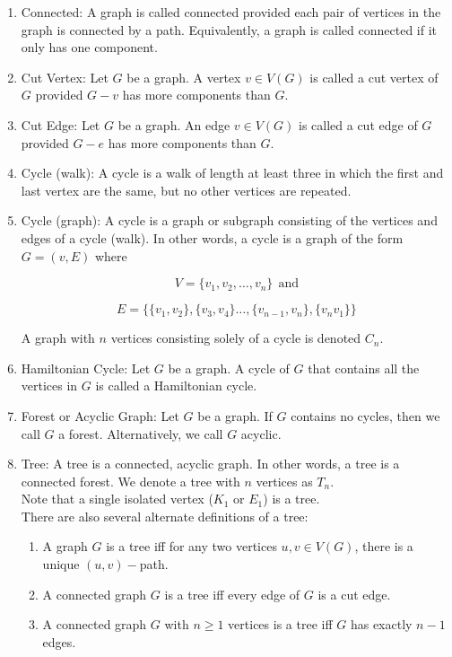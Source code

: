 \documentclass{article}
\begin{document}
\begin{enumerate}
    \item Connected: A graph is called connected provided each pair of vertices in the graph is connected by a path. Equivalently, a graph is called connected if it only has one component. 
    
    \item Cut Vertex: Let $G$ be a graph. A vertex $v\in V(G)$ is called a cut vertex of $G$ provided $G-v$ has more components than $G$.
    
    \item Cut Edge: Let $G$ be a graph. An edge $v\in V(G)$ is called a cut edge of $G$ provided $G-e$ has more components than $G$.
    
    \item Cycle (walk): A cycle is a walk of length at least three in which the first and last vertex are the same, but no other vertices are repeated.
    
    \item Cycle (graph): A cycle is a graph or subgraph consisting of the vertices and edges of a cycle (walk). In other words, a cycle is a graph of the form $G=(v,E)$ where 
    
    \[V=\{v_1,v_2,\dots,v_n\} \:\: \text{and}\]
    
    \[E=\{\{v_1,v_2\}, \{v_3,v_4\}\dots,\{v_{n-1},v_n\},\{v_nv_1\}\}\]
    
    A graph with $n$ vertices consisting solely of a cycle is denoted $C_n$.
    
    \item Hamiltonian Cycle: Let $G$ be a graph. A cycle of $G$ that contains all the vertices in $G$ is called a Hamiltonian cycle.
    
    \item Forest or Acyclic Graph: Let $G$ be a graph. If $G$ contains no cycles, then we call $G$ a forest. Alternatively, we call $G$ acyclic.
    
    \item Tree: A tree is a connected, acyclic graph. In other words, a tree is a connected forest. We denote a tree with $n$ vertices as $T_n$.\\
    
    Note that a single isolated vertex ($K_1$ or $E_1$) is a tree.\\
    
    There are also several alternate definitions of a tree:
    
        \begin{enumerate}
            \item A graph $G$ is a tree iff for any two vertices $u,v\in V(G)$, there is a unique $(u,v)-$path. 
            \item A connected graph $G$ is a tree iff every edge of $G$ is a cut edge.
            \item A connected graph $G$ with $n\geq 1$ vertices is a tree iff $G$ has exactly $n-1$ edges.
        \end{enumerate}
        

\end{enumerate}
\end{document}
